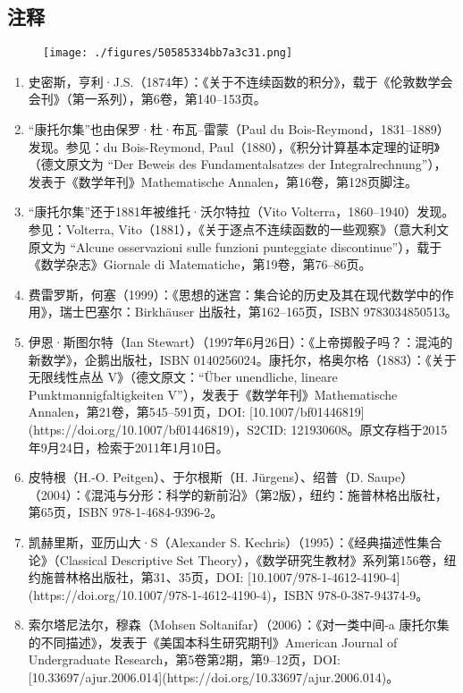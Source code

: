 \subsection{注释}
\begin{figure}[ht]
\centering
\texttt{[image: ./figures/50585334bb7a3c31.png]}
\caption{} \label{fig_KTRJ_10}
\end{figure}
\begin{enumerate}
\item 史密斯，亨利·J.S.（1874年）：《关于不连续函数的积分》，载于《伦敦数学会会刊》（第一系列），第6卷，第140–153页。
\item “康托尔集”也由保罗·杜·布瓦–雷蒙（Paul du Bois-Reymond，1831–1889）发现。参见：du Bois-Reymond, Paul（1880），《积分计算基本定理的证明》（德文原文为 “Der Beweis des Fundamentalsatzes der Integralrechnung”），发表于《数学年刊》Mathematische Annalen，第16卷，第128页脚注。
\item “康托尔集”还于1881年被维托·沃尔特拉（Vito Volterra，1860–1940）发现。参见：Volterra, Vito（1881），《关于逐点不连续函数的一些观察》（意大利文原文为 “Alcune osservazioni sulle funzioni punteggiate discontinue”），载于《数学杂志》Giornale di Matematiche，第19卷，第76–86页。
\item 费雷罗斯，何塞（1999）：《思想的迷宫：集合论的历史及其在现代数学中的作用》，瑞士巴塞尔：Birkhäuser 出版社，第162–165页，ISBN 9783034850513。
\item 伊恩·斯图尔特（Ian Stewart）（1997年6月26日）：《上帝掷骰子吗？：混沌的新数学》，企鹅出版社，ISBN 0140256024。康托尔，格奥尔格（1883）：《关于无限线性点丛 V》（德文原文：“Über unendliche, lineare Punktmannigfaltigkeiten V”），发表于《数学年刊》Mathematische Annalen，第21卷，第545–591页，DOI: [10.1007/bf01446819](https://doi.org/10.1007/bf01446819)，S2CID: 121930608。原文存档于2015年9月24日，检索于2011年1月10日。
\item 皮特根（H.-O. Peitgen）、于尔根斯（H. Jürgens）、绍普（D. Saupe）（2004）：《混沌与分形：科学的新前沿》（第2版），纽约：施普林格出版社，第65页，ISBN 978-1-4684-9396-2。
\item 凯赫里斯，亚历山大·S（Alexander S. Kechris）（1995）：《经典描述性集合论》（Classical Descriptive Set Theory），《数学研究生教材》系列第156卷，纽约施普林格出版社，第31、35页，DOI: [10.1007/978-1-4612-4190-4](https://doi.org/10.1007/978-1-4612-4190-4)，ISBN 978-0-387-94374-9。
\item 索尔塔尼法尔，穆森（Mohsen Soltanifar）（2006）：《对一类中间-a 康托尔集的不同描述》，发表于《美国本科生研究期刊》American Journal of Undergraduate Research，第5卷第2期，第9–12页，DOI: [10.33697/ajur.2006.014](https://doi.org/10.33697/ajur.2006.014)。

\end{enumerate}
